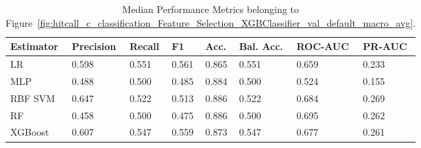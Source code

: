\begin{longtable}{llllllll}
\caption{Median Performance Metrics belonging to Figure~\ref{fig:hitcall_c_classification_Feature_Selection_XGBClassifier_val_default_macro_avg}.}\label{tab:table:hitcall_c_classification_feature_selection_xgbclassifier_val_default_macro_avg}\\
\toprule
\midrule
\small Estimator & \small Precision & \small Recall & \small F1 & \small Acc. & \small Bal. Acc. & \small ROC-AUC & \small PR-AUC\\
\hline
LR & 0.598 & 0.551 & 0.561 & 0.865 & 0.551 & 0.659 & 0.233\\
MLP & 0.488 & 0.500 & 0.485 & 0.884 & 0.500 & 0.524 & 0.155\\
RBF SVM & 0.647 & 0.522 & 0.513 & 0.886 & 0.522 & 0.684 & 0.269\\
RF & 0.458 & 0.500 & 0.475 & 0.886 & 0.500 & 0.695 & 0.262\\
XGBoost & 0.607 & 0.547 & 0.559 & 0.873 & 0.547 & 0.677 & 0.261\\
\bottomrule
\end{longtable}